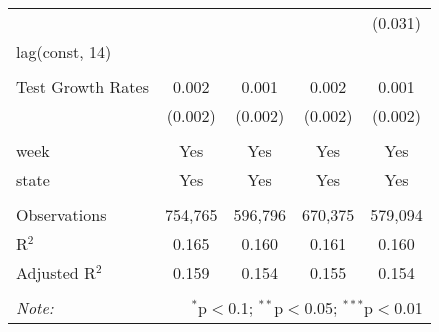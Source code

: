 \begin{tabular}{@{\extracolsep{1pt}}lcccc}
  &  &  &  & (0.031) \\ 
  lag(const, 14) &  &  &  &  \\ 
  &  &  &  &  \\ 
  Test Growth Rates & 0.002 & 0.001 & 0.002 & 0.001 \\ 
  & (0.002) & (0.002) & (0.002) & (0.002) \\ 
 \hline \\[-1.8ex] 
week & Yes & Yes & Yes & Yes \\ 
state & Yes & Yes & Yes & Yes \\ 
\hline \\[-1.8ex] 
Observations & 754,765 & 596,796 & 670,375 & 579,094 \\ 
R$^{2}$ & 0.165 & 0.160 & 0.161 & 0.160 \\ 
Adjusted R$^{2}$ & 0.159 & 0.154 & 0.155 & 0.154 \\ 
\hline 
\hline \\[-1.8ex] 
\textit{Note:}  & \multicolumn{4}{r}{$^{*}$p$<$0.1; $^{**}$p$<$0.05; $^{***}$p$<$0.01} \\ 
\end{tabular} 